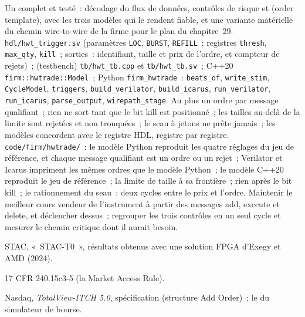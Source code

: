 \begin{build}
 Un  complet et testé~: décodage du flux de données, contrôles de risque et  (order template), avec les trois modèles qui le rendent
fiable, et une variante matérielle du chemin wire-to-wire de la firme pour le plan du chapitre~29.
 \texttt{hdl/hwt\_trigger.sv} (paramètres \texttt{LOC}, \texttt{BURST}, \texttt{REFILL}~; registres \texttt{thresh},
\texttt{max\_qty}, \texttt{kill}~; sorties~: identifiant, taille et prix de l'ordre, et compteur de rejets)~;  (testbench) \texttt{tb/hwt\_tb.cpp} et
\texttt{tb/hwt\_tb.sv}~; C++20 \texttt{firm::hwtrade::Model}~; Python \texttt{firm\_hwtrade}~: \texttt{beats\_of}, \texttt{write\_stim},
\texttt{CycleModel}, \texttt{triggers}, \texttt{build\_verilator}, \texttt{build\_icarus}, \texttt{run\_verilator}, \texttt{run\_icarus},
\texttt{parse\_output}, \texttt{wirepath\_stage}.
 Au plus un ordre par message qualifiant~; rien ne sort tant que le bit kill est positionné~; les tailles au-delà de la limite sont rejetées et
non tronquées~; le seau à jetons ne prête jamais~; les modèles concordent avec le registre HDL, registre par registre.
 \texttt{code/firm/hwtrade/}~: le modèle Python reproduit les quatre réglages du jeu de référence, et chaque message qualifiant
est un ordre ou un rejet~; Verilator et Icarus impriment les mêmes ordres que le modèle Python~; le modèle C++20 reproduit le jeu de référence~;
la limite de taille à sa frontière~; rien après le bit kill~; le rationnement du seau~; deux cycles entre le prix et l'ordre.
 Maintenir le meilleur cours vendeur de l'instrument à partir des messages add, execute et delete, et déclencher dessus~; regrouper les trois contrôles en
un seul cycle et mesurer le chemin critique dont il aurait besoin.
\end{build}

\begin{omsources}
\item STAC, «~STAC-T0~», résultats obtenus avec une solution FPGA d'Exegy et AMD (2024).
\item 17 CFR 240.15c3-5 (la Market Access Rule).
\item Nasdaq, \emph{TotalView-ITCH 5.0}, spécification (structure Add Order)~; le  du simulateur de bourse.
\end{omsources}

